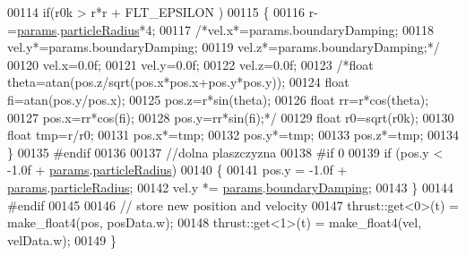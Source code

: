 \begin{DoxyCode}
00114                 \textcolor{keywordflow}{if}(r0k > r*r + FLT\_EPSILON )
00115                 \{
00116                         r-=\hyperlink{particles__kernel__impl_8cuh_a8db8938e28edd17862daf58651051bdc}{params}.\hyperlink{struct_sim_params_a7e131c24e1020c44173deb0f57a8c4af}{particleRadius}*4;
00117                         \textcolor{comment}{/*vel.x*=params.boundaryDamping;}
00118 \textcolor{comment}{                        vel.y*=params.boundaryDamping;}
00119 \textcolor{comment}{                        vel.z*=params.boundaryDamping;*/}
00120                         vel.x=0.0f;
00121                         vel.y=0.0f;
00122                         vel.z=0.0f;
00123                         \textcolor{comment}{/*float theta=atan(pos.z/sqrt(pos.x*pos.x+pos.y*pos.y));}
00124 \textcolor{comment}{                        float fi=atan(pos.y/pos.x);}
00125 \textcolor{comment}{                        pos.z=r*sin(theta);}
00126 \textcolor{comment}{                        float rr=r*cos(theta);}
00127 \textcolor{comment}{                        pos.x=rr*cos(fi);}
00128 \textcolor{comment}{                        pos.y=rr*sin(fi);*/}
00129                         \textcolor{keywordtype}{float} r0=sqrt(r0k);
00130                         \textcolor{keywordtype}{float} tmp=r/r0;
00131                         pos.x*=tmp;
00132                         pos.y*=tmp;
00133                         pos.z*=tmp;
00134                 \}
00135 \textcolor{preprocessor}{#endif}
00136 \textcolor{preprocessor}{}
00137 \textcolor{comment}{//dolna plaszczyzna}
00138 \textcolor{preprocessor}{#if 0}
00139 \textcolor{preprocessor}{}        \textcolor{keywordflow}{if} (pos.y < -1.0f + \hyperlink{particles__kernel__impl_8cuh_a8db8938e28edd17862daf58651051bdc}{params}.\hyperlink{struct_sim_params_a7e131c24e1020c44173deb0f57a8c4af}{particleRadius})
00140         \{
00141             pos.y = -1.0f + \hyperlink{particles__kernel__impl_8cuh_a8db8938e28edd17862daf58651051bdc}{params}.\hyperlink{struct_sim_params_a7e131c24e1020c44173deb0f57a8c4af}{particleRadius};
00142             vel.y *= \hyperlink{particles__kernel__impl_8cuh_a8db8938e28edd17862daf58651051bdc}{params}.\hyperlink{struct_sim_params_a4da0c7593d6569e48ee50e7d0c7576f9}{boundaryDamping};
00143         \}
00144 \textcolor{preprocessor}{#endif}
00145 \textcolor{preprocessor}{}
00146         \textcolor{comment}{// store new position and velocity}
00147         thrust::get<0>(t) = make\_float4(pos, posData.w);
00148         thrust::get<1>(t) = make\_float4(vel, velData.w);
00149     \}
\end{DoxyCode}


